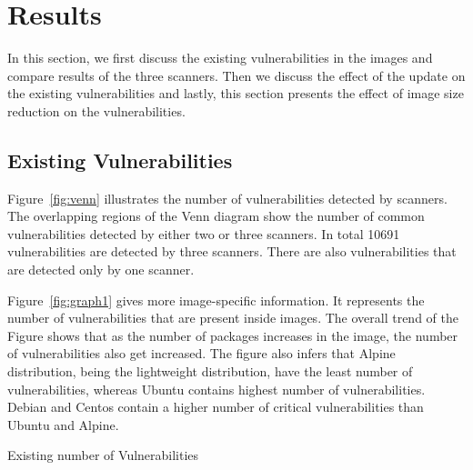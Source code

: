 \documentclass[a4paper,num-refs]{oup-contemporary}
\begin{document}
\section{Results}

In this section,
we first discuss the existing vulnerabilities in the images and compare
results of the three scanners. Then we discuss the effect of the update on the
existing vulnerabilities and lastly, this section presents the effect of image size reduction on the
vulnerabilities.

\subsection{Existing Vulnerabilities}

Figure~\ref{fig:venn} illustrates the number of vulnerabilities detected by scanners. The
overlapping regions of the Venn diagram show the number of common vulnerabilities detected by either two or
three scanners. In total 10691 vulnerabilities are detected by three scanners.
There are also vulnerabilities that are detected only by one scanner.

Figure~\ref{fig:graph1} gives more image-specific information.
It represents the number of vulnerabilities that are present inside images.
The overall trend of the Figure shows that as the number of packages increases in the image, the number of vulnerabilities
also get increased.
The figure also infers that Alpine distribution, being the
lightweight distribution, have the least number of vulnerabilities, whereas Ubuntu contains highest number of
vulnerabilities. Debian and Centos contain a higher number of critical vulnerabilities than Ubuntu and Alpine.

\begin{table}
%
       \centering
	\caption{\label{table1}Existing number of Vulnerabilities}
\end{table}
\end{document}
